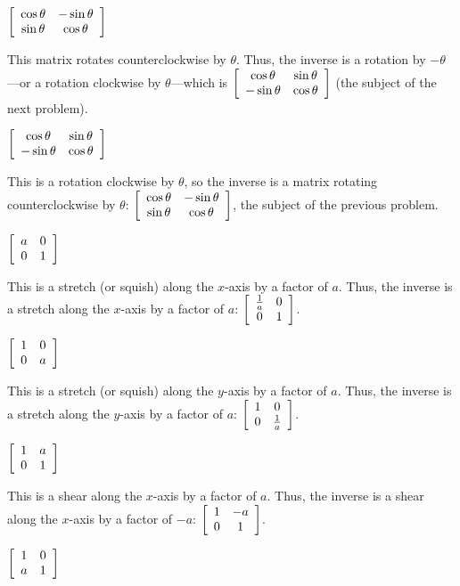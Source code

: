 \documentclass[../key.tex]{subfiles}
\begin{document}
\begin{inner_problem}
\item $\left[\begin{array}{cc} \cos\theta & -\sin\theta \\ \sin\theta & \cos\theta \end{array}\right]$
\end{inner_problem}

This matrix rotates counterclockwise by $\theta$. Thus, the inverse is a rotation by $-\theta$---or a rotation clockwise by $\theta$---which is $\left[\begin{array}{cc} \cos\theta & \sin\theta \\ -\sin\theta & \cos\theta \end{array}\right]$ (the subject of the next problem).

\begin{inner_problem}
\item $\left[\begin{array}{cc} \cos\theta & \sin\theta \\ -\sin\theta & \cos\theta \end{array}\right]$
\end{inner_problem}

This is a rotation clockwise by $\theta$, so the inverse is a matrix rotating counterclockwise by $\theta$: $\left[\begin{array}{cc} \cos\theta & -\sin\theta \\ \sin\theta & \cos\theta \end{array}\right]$, the subject of the previous problem.

\begin{inner_problem}
\item $\left[\begin{array}{cc} a & 0 \\ 0 & 1 \end{array}\right]$
\end{inner_problem}

This is a stretch (or squish) along the $x$-axis by a factor of $a$. Thus, the inverse is a stretch along the $x$-axis by a factor of $a$: $\left[\begin{array}{cc} \frac{1}{a} & 0 \\ 0 & 1 \end{array}\right]$.

\begin{inner_problem}
\item $\left[\begin{array}{cc} 1 & 0 \\ 0 & a \end{array}\right]$
\end{inner_problem}

This is a stretch (or squish) along the $y$-axis by a factor of $a$. Thus, the inverse is a stretch along the $y$-axis by a factor of $a$: $\left[\begin{array}{cc} 1 & 0 \\ 0 & \frac{1}{a} \end{array}\right]$.

\begin{inner_problem}
\item $\left[\begin{array}{cc} 1 & a \\ 0 & 1 \end{array}\right]$
\end{inner_problem}

This is a shear along the $x$-axis by a factor of $a$. Thus, the inverse is a shear along the $x$-axis by a factor of $-a$: $\left[\begin{array}{cc} 1 & -a \\ 0 & 1 \end{array}\right]$.

\begin{inner_problem}
\item $\left[\begin{array}{cc} 1 & 0 \\ a & 1 \end{array}\right]$
\end{inner_problem}
\end{document}
